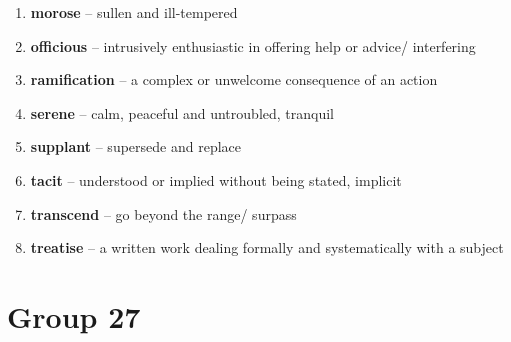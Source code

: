 \begin{enumerate}[wide,labelindent=0pt]
\item \textbf{morose} -- sullen and ill-tempered
\item \textbf{officious} -- intrusively enthusiastic in offering help or advice/ interfering
\item \textbf{ramification} -- a complex or unwelcome consequence of an action
\item \textbf{serene} -- calm, peaceful and untroubled, tranquil
\item \textbf{supplant} -- supersede and replace
\item \textbf{tacit} -- understood or implied without being stated, implicit
\item \textbf{transcend} -- go beyond the range/ surpass
\item \textbf{treatise} -- a written work dealing formally and systematically with a subject
\end{enumerate}

\newpage
\section{Group 27}

